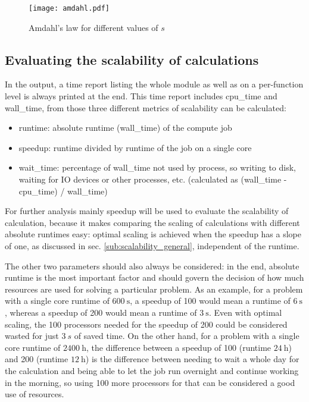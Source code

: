 \documentclass[main.tex]{subfiles}
\begin{document}
\begin{figure}[ht!]
    \centering
    \texttt{[image: amdahl.pdf]}
    \label{fig:amdahl}
    \caption{Amdahl's law for different values of \(s\)}
\end{figure}

\subsection{Evaluating the scalability of \QE calculations}\label{sub:scalability_qe}

In the \QE output, a time report listing the whole module as well as on a per-function level is always printed at the end.
This time report includes \gls{cpu_time} and \gls{wall_time}, from those three different metrics of scalability can be calculated:
\begin{itemize}
    \item runtime: absolute runtime (\gls{wall_time}) of the compute job
    \item speedup: runtime divided by runtime of the job on a single core
    \item \gls{wait_time}: percentage of \gls{wall_time} not used by \QE process, so writing to disk, waiting for IO devices or other processes, etc. (calculated as (\gls{wall_time} - \gls{cpu_time}) / \gls{wall_time})
\end{itemize}
For further analysis mainly speedup will be used to evaluate the scalability of \QE calculation, because it makes comparing the scaling of calculations with different absolute runtimes easy: optimal scaling is achieved when the speedup has a slope of one, as discussed in sec. \ref{sub:scalability_general}, independent of the runtime.

The other two parameters should also always be considered: in the end, absolute runtime is the most important factor and should govern the decision of how much resources are used for solving a particular problem.
As an example, for a problem with a single core runtime of \(\SI{600}{\s}\), a speedup of 100 would mean a runtime of \(\SI{6}{\s}\), whereas a speedup of 200 would mean a runtime of \(\SI{3}{\s}\).
Even with optimal scaling, the 100 processors needed for the speedup of 200 could be considered wasted for just \(\SI{3}{s}\) of saved time.
On the other hand, for a problem with a single core runtime of \(\SI{2400}{\hour}\), the difference between a speedup of 100 (runtime \(\SI{24}{\hour}\)) and 200 (runtime \(\SI{12}{\hour}\)) is the difference between needing to wait a whole day for the calculation and being able to let the job run overnight and continue working in the morning, so using 100 more processors for that can be considered a good use of resources.
\end{document}
